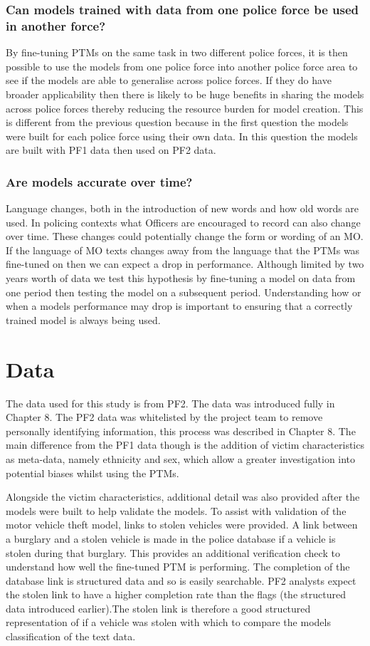 \subsubsection{Can models trained with data from one police force be used in another force?} By fine-tuning PTMs on the same task in two different police forces, it is then possible to use the models from one police force into another police force area to see if the models are able to generalise across police forces. If they do have broader applicability then there is likely to be huge benefits in sharing the models across police forces thereby reducing the resource burden for model creation. This is different from the previous question because in the first question the models were built for each police force using their own data. In this question the models are built with PF1 data then used on PF2 data.

\subsubsection{Are models accurate over time?} Language changes, both in the introduction of new words and how old words are used. In policing contexts what Officers are encouraged to record can also change over time. These changes could potentially change the form or wording of an MO.  If the language of MO texts changes away from the language that the PTMs was fine-tuned on then we can expect a drop in performance. Although limited by two years worth of data we test this hypothesis by fine-tuning a model on data from one period then testing the model on a subsequent period. Understanding how or when a models performance may drop is important to ensuring that a correctly trained model is always being used.

\section{Data} The data used for this study is from PF2. The data was introduced fully in Chapter 8. The PF2 data was whitelisted by the project team to remove personally identifying information, this process was described in Chapter 8. The main difference from the PF1 data though is the addition of victim characteristics as meta-data, namely ethnicity and sex, which allow a greater investigation into potential biases whilst using the PTMs. 

Alongside the victim characteristics, additional detail was also provided after the models were built to help validate the models. To assist with validation of the motor vehicle theft model, links to stolen vehicles were provided. A link between a burglary and a stolen vehicle is made in the police database if a vehicle is stolen during that burglary. This provides an additional verification check to understand how well the fine-tuned PTM is performing. The completion of the database link is  structured data and so is easily searchable. PF2 analysts expect the stolen link to have a higher completion rate than the flags (the structured data introduced earlier).The stolen link is therefore a good structured representation of if a vehicle was stolen with which to compare the models classification of the text data.


